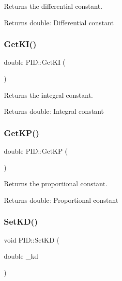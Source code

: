 Returns the differential constant. 

\begin{DoxyReturn}{Returns}
double\+: Differential constant 
\end{DoxyReturn}
\mbox{\label{classPID_aff6252318303da61600d6d10bd16cc83}} 
\subsubsection{\texorpdfstring{Get\+K\+I()}{GetKI()}}
{\footnotesize\ttfamily double P\+I\+D\+::\+Get\+KI (\begin{DoxyParamCaption}{ }\end{DoxyParamCaption})}



Returns the integral constant. 

\begin{DoxyReturn}{Returns}
double\+: Integral constant 
\end{DoxyReturn}
\mbox{\label{classPID_a0b9d04c13dc740eaf8f7ce408ebe2fe5}} 
\subsubsection{\texorpdfstring{Get\+K\+P()}{GetKP()}}
{\footnotesize\ttfamily double P\+I\+D\+::\+Get\+KP (\begin{DoxyParamCaption}{ }\end{DoxyParamCaption})}



Returns the proportional constant. 

\begin{DoxyReturn}{Returns}
double\+: Proportional constant 
\end{DoxyReturn}
\mbox{\label{classPID_a36036f3b87f536408dad924bae81394b}} 
\subsubsection{\texorpdfstring{Set\+K\+D()}{SetKD()}}
{\footnotesize\ttfamily void P\+I\+D\+::\+Set\+KD (\begin{DoxyParamCaption}\item[{double}]{\+\_\+kd }\end{DoxyParamCaption})}



